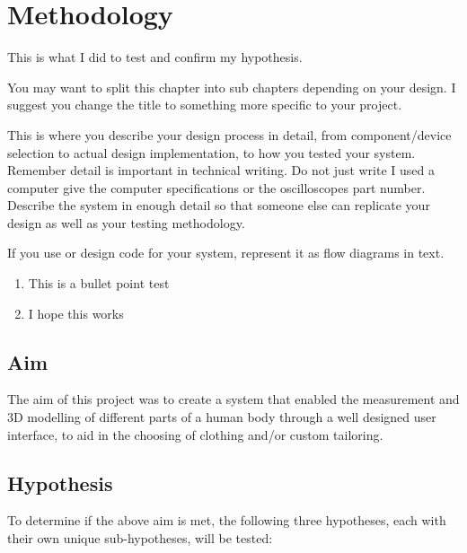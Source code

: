 \chapter{Methodology} \label{methodology}

This is what I did to test and confirm my hypothesis.


You may want to split this chapter into sub chapters depending on your design. I suggest you change
the title to something more specific to your project.

This is where you describe your design process in detail, from component/device selection to actual
design implementation, to how you tested your system. Remember detail is important in technical
writing. Do not just write I used a computer give the computer specifications or the oscilloscopes part
number. Describe the system in enough detail so that someone else can replicate your design as well
as your testing methodology.

If you use or design code for your system, represent it as flow diagrams in text.

\begin{enumerate}
\item This is a bullet point test
\item I hope this works
	
\end{enumerate}	

\section{Aim} \label{methodologyAim}
The aim of this project was to create a system that enabled the measurement and 3D modelling of different parts of a human body through a well designed user interface, to aid in the choosing of clothing and/or custom tailoring.

\section{Hypothesis} \label{methodologyHypothesis}
To determine if the above aim is met, the following three hypotheses, each with their own unique sub-hypotheses, will be tested:

